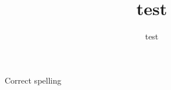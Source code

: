 \documentclass[12pt]{article}
\author{test}
\title{test}
\begin{document}
  Correct spelling
\end{document}
